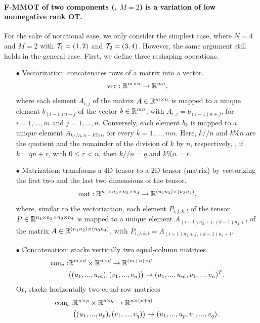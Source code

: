\paragraph{F-MMOT of two components (\ie, $M=2$) is a variation of low nonnegative rank OT.}
For the sake of notational ease, we only consider the simplest case, where $N=4$ and $M=2$
with $\mathcal T_1 = (1,2)$ and $\mathcal T_2 = (3,4)$. However, the same argument still holds
in the general case. First, we define three reshaping operations.
\begin{itemize}
  \item[$\bullet$] Vectorization: concatenates rows of a matrix into a vector.
  \begin{equation}
    \text{vec}: \mathbb R^{m \times n} \to \mathbb R^{m n},
  \end{equation}
  where each element $A_{i,j}$ of the matrix $A \in \mathbb R^{m \times n}$ is
  mapped to a unique element $b_{(i-1)n + j}$ of the vector
  $b \in \mathbb R^{m n}$, with $A_{i,j} = b_{(i-1)n + j}$, for $i = 1, ..., m$ and $j = 1, ...,n$.
  Conversely, each element $b_k$ is mapped to a unique element $A_{k // n, n - k \% n}$,
  for every $k = 1, ..., mn$. Here, $k // n$ and $k \% n$ are the quotient and
  the remainder of the division of $k$ by $n$,
  respectively, \ie, if $k = q n + r$, with $0 \leq r < n$, then $k // n = q$ and $k \% n = r$.

  \item[$\bullet$] Matrization: transforms a $4$D tensor to a $2$D tensor (matrix) by
  vectorizing the first two and the last two dimensions of the tensor.
  \begin{equation}
    \text{mat}: \mathbb R^{n_1 \times n_2 \times n_3 \times n_4} \to \mathbb R^{(n_1 n_2) \times (n_3 n_4)},
  \end{equation}
  where, similar to the vectorization, each element $P_{i,j,k,l}$ of the tensor
  $P \in \mathbb R^{n_1 \times n_2 \times n_3 \times n_4}$ is mapped to
  a unique element $A_{(i-1)n_2 + j, (k-1)n_4 + l}$ of the
  matrix $A \in \mathbb R^{(n_1 n_2) \times (n_3 n_4)}$,
  with $P_{i,j,k,l} = A_{(i-1)n_2 + j, (k-1)n_4 + l}$.

  \item[$\bullet$] Concatenation: stacks vertically two equal-column matrices.
  \begin{equation}
    \begin{split}
      \text{con}_v: &\mathbb R^{m \times d} \times \mathbb R^{n \times d} \to \mathbb R^{(m+n) \times d} \\
      & \big( (u_1, ..., u_m),(v_1, ..., v_n) \big) \to (u_1, ..., u_m, v_1, ..., v_n)^T.
    \end{split}
  \end{equation}
  Or, stacks horizontally two equal-row matrices
  \begin{equation}
    \begin{split}
      \text{con}_h: &\mathbb R^{n \times p} \times \mathbb R^{n \times q} \to \mathbb R^{n \times (p+q)} \\
      & \big( (u_1, ..., u_p),(v_1, ..., v_q) \big) \to (u_1, ..., u_p, v_1, ..., v_q).
    \end{split}
  \end{equation}
\end{itemize}
